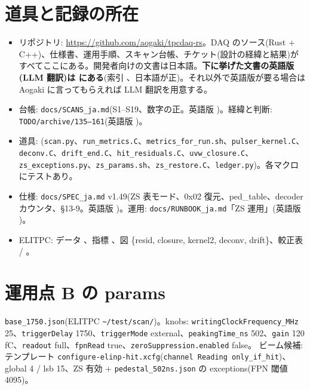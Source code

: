 \documentclass[a4paper,11pt]{ltjsarticle}
\begin{document}
\section{道具と記録の所在}
\begin{itemize}
\item リポジトリ: \url{https://github.com/aogaki/tpcdaq-rs}。DAQ のソース(Rust + C++)、仕様書、運用手順、スキャン台帳、チケット(設計の経緯と結果)がすべてここにある。開発者向けの文書は日本語。\textbf{下に挙げた文書の英語版(LLM 翻訳)は  にある}(索引 、日本語が正)。それ以外で英語版が要る場合は Aogaki に言ってもらえれば LLM 翻訳を用意する。
\item 台帳: \texttt{docs/SCANS\_ja.md}(S1--S19、数字の正。英語版 )。経緯と判断: \texttt{TODO/archive/135--161}(英語版 )。
\item 道具: (\sloppy \texttt{scan.py}、\texttt{run\_metrics.C}、\texttt{metrics\_for\_run.sh}、\texttt{pulser\_kernel.C}、\texttt{deconv.C}、\texttt{drift\_end.C}、\texttt{hit\_residuals.C}、\texttt{uvw\_closure.C}、\texttt{zs\_exceptions.py}、\texttt{zs\_params.sh}、\texttt{zs\_restore.C}、\texttt{ledger.py})。各マクロにテストあり。
\item 仕様: \texttt{docs/SPEC\_ja.md} v1.49(ZS 表モード、0x02 復元、ped\_table、decoder カウンタ、§13-9。英語版 )。運用: \texttt{docs/RUNBOOK\_ja.md}「ZS 運用」(英語版 )。
\item ELITPC: データ 、指標 、図 \{resid, closure, kernel2, deconv, drift\}、較正表  / 。
\end{itemize}

\section{運用点 B の params}
\texttt{base\_1750.json}(ELITPC \texttt{\textasciitilde/test/scan/})。knobs: \texttt{writingClockFrequency\_MHz} 25、\texttt{triggerDelay} 1750、\texttt{triggerMode} external、\texttt{peakingTime\_ns} 502、\texttt{gain} 120 fC、\texttt{readout} full、\texttt{fpnRead} true、\texttt{zeroSuppression.enabled} false。
ビーム候補: テンプレート \texttt{configure-elinp-hit.xcfg}(\texttt{channel Reading only\_if\_hit})、global 4 / lsb 15、ZS 有効 + \texttt{pedestal\_502ns.json} の exceptions(FPN 閾値 4095)。
\end{document}
